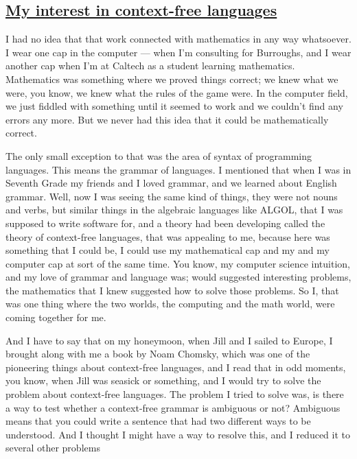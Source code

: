 \documentclass[]{article}
\begin{document}
\subsection{\texorpdfstring{\href{http://webofstories.com/play/17089}{My
interest in context-free
languages}}{My interest in context-free languages}}\label{my-interest-in-context-free-languages}

I had no idea that that work connected with mathematics in any way
whatsoever. I wear one cap in the computer --- when I'm consulting for
Burroughs, and I wear another cap when I'm at Caltech as a student
learning mathematics. Mathematics was something where we proved things
correct; we knew what we were, you know, we knew what the rules of the
game were. In the computer field, we just fiddled with something until
it seemed to work and we couldn't find any errors any more. But we never
had this idea that it could be mathematically correct.

The only small exception to that was the area of syntax of programming
languages. This means the grammar of languages. I mentioned that when I
was in Seventh Grade my friends and I loved grammar, and we learned
about English grammar. Well, now I was seeing the same kind of things,
they were not nouns and verbs, but similar things in the algebraic
languages like ALGOL, that I was supposed to write software for, and a
theory had been developing called the theory of context-free languages,
that was appealing to me, because here was something that I could be, I
could use my mathematical cap and my and my computer cap at sort of the
same time. You know, my computer science intuition, and my love of
grammar and language was; would suggested interesting problems, the
mathematics that I knew suggested how to solve those problems. So I,
that was one thing where the two worlds, the computing and the math
world, were coming together for me.

And I have to say that on my honeymoon, when Jill and I sailed to
Europe, I brought along with me a book by Noam Chomsky, which was one of
the pioneering things about context-free languages, and I read that in
odd moments, you know, when Jill was seasick or something, and I would
try to solve the problem about context-free languages. The problem I
tried to solve was, is there a way to test whether a context-free
grammar is ambiguous or not? Ambiguous means that you could write a
sentence that had two different ways to be understood. And I thought I
might have a way to resolve this, and I reduced it to several other
problems
\end{document}

